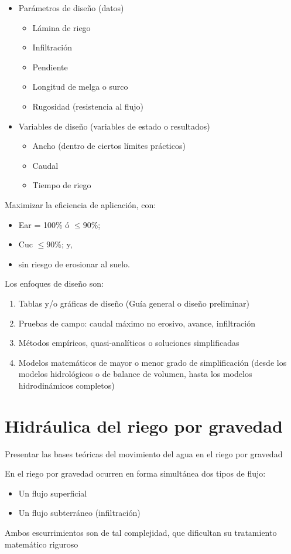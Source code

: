 \begin{itemize}
    \item Parámetros de diseño (datos) \begin{itemize}
        \item Lámina de riego
        \item Infiltración
        \item Pendiente
        \item Longitud de melga o surco
        \item Rugosidad (resistencia al flujo)
    \end{itemize}
    \item Variables de diseño (variables de estado o resultados) \begin{itemize}
        \item Ancho (dentro de ciertos límites prácticos)
        \item Caudal
        \item Tiempo de riego
    \end{itemize}
\end{itemize}
Maximizar la eficiencia de aplicación, con:
\begin{itemize}
    \item Ear = 100\% ó $\leq 90$\%;
    \item Cuc $\leq 90$\%; y,
    \item sin riesgo de erosionar al suelo.
\end{itemize}
Los enfoques de diseño son:
\begin{enumerate}
    \item Tablas y/o gráficas de diseño (Guía general o diseño preliminar)
    \item Pruebas de campo: caudal máximo no erosivo, avance, infiltración
    \item Métodos empíricos, quasi-analíticos o soluciones simplificadas
    \item Modelos matemáticos de mayor o menor grado de simplificación (desde los modelos hidrológicos o de balance de volumen, hasta los modelos hidrodinámicos completos)
\end{enumerate}
\section{Hidráulica del riego por gravedad}
Presentar las bases teóricas del movimiento del agua en el riego por gravedad

En el riego por gravedad ocurren en forma simultánea dos tipos de flujo:
\begin{itemize}
    \item Un flujo superficial
    \item Un flujo subterráneo (infiltración)
\end{itemize}
Ambos escurrimientos son de tal complejidad, que dificultan su tratamiento matemático riguroso

